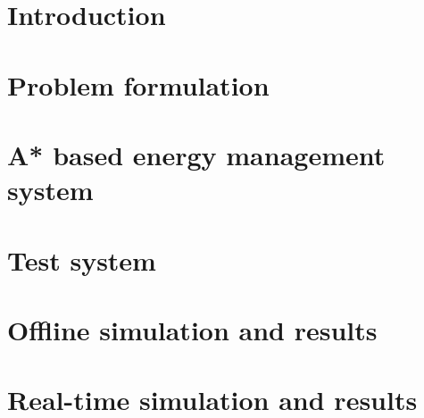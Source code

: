 \documentclass[journal]{IEEEtran}
\begin{document}
\IEEEpeerreviewmaketitle

\section{Introduction}


\section{Problem formulation} \label{formulation}


\section{A* based energy management system} \label{A*}


\section{Test system} \label{sys}


\section{Offline simulation and results} \label{OFF}


\section{Real-time simulation and results} \label{RT}



% 
% 
\end{document}
